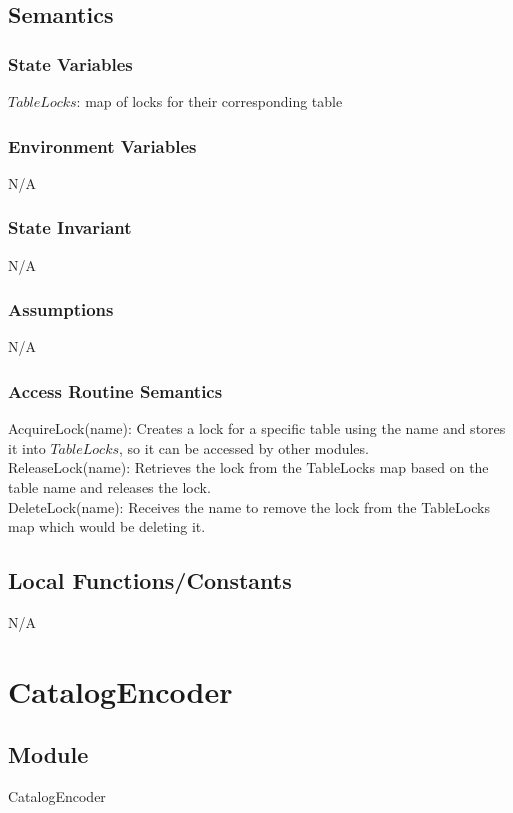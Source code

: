 \documentclass[12pt]{article}
\begin{document}
\subsection{Semantics}
\subsubsection{State Variables}
$TableLocks$: map of locks for their corresponding table

\subsubsection{Environment Variables}
N/A
\subsubsection{State Invariant}
N/A
\subsubsection{Assumptions}
N/A

\subsubsection{Access Routine Semantics}
\noindent AcquireLock(name): Creates a lock for a specific table using the name and stores it into $TableLocks$, so it can be accessed by other modules. \\

\noindent ReleaseLock(name): Retrieves the lock from the TableLocks map based on the table name and releases the lock. \\

\noindent DeleteLock(name): Receives the name to remove the lock from the TableLocks map which would be deleting it. \\

\subsection{Local Functions/Constants}
N/A

\newpage

\section{CatalogEncoder}

\subsection{Module}
CatalogEncoder
\end{document}
